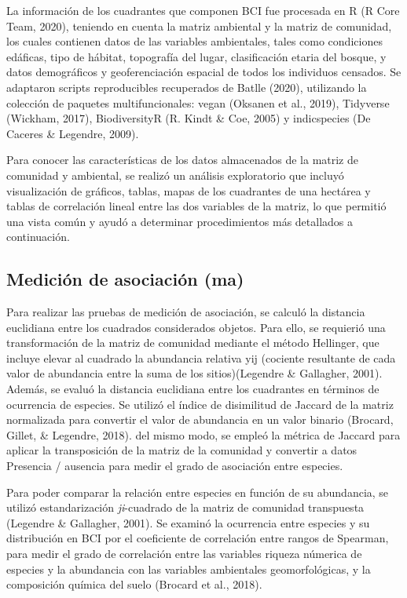 \documentclass[11pt,]{article}
\begin{document}
La información de los cuadrantes que componen BCI fue procesada en R (R
Core Team, 2020), teniendo en cuenta la matriz ambiental y la matriz de
comunidad, los cuales contienen datos de las variables ambientales,
tales como condiciones edáficas, tipo de hábitat, topografía del lugar,
clasificación etaria del bosque, y datos demográficos y geoferenciación
espacial de todos los individuos censados. Se adaptaron scripts
reproducibles recuperados de Batlle (2020), utilizando la colección de
paquetes multifuncionales: vegan (Oksanen et al., 2019), Tidyverse
(Wickham, 2017), BiodiversityR (R. Kindt \& Coe, 2005) y indicspecies
(De Caceres \& Legendre, 2009).

Para conocer las características de los datos almacenados de la matriz
de comunidad y ambiental, se realizó un análisis exploratorio que
incluyó visualización de gráficos, tablas, mapas de los cuadrantes de
una hectárea y tablas de correlación lineal entre las dos variables de
la matriz, lo que permitió una vista común y ayudó a determinar
procedimientos más detallados a continuación.

\subsection{Medición de asociación
(ma)}\label{mediciuxf3n-de-asociaciuxf3n-ma}

Para realizar las pruebas de medición de asociación, se calculó la
distancia euclidiana entre los cuadrados considerados objetos. Para
ello, se requierió una transformación de la matriz de comunidad mediante
el método Hellinger, que incluye elevar al cuadrado la abundancia
relativa yij (cociente resultante de cada valor de abundancia entre la
suma de los sitios)(Legendre \& Gallagher, 2001). Además, se evaluó la
distancia euclidiana entre los cuadrantes en términos de ocurrencia de
especies. Se utilizó el índice de disimilitud de Jaccard de la matriz
normalizada para convertir el valor de abundancia en un valor binario
(Brocard, Gillet, \& Legendre, 2018). del mismo modo, se empleó la
métrica de Jaccard para aplicar la transposición de la matriz de la
comunidad y convertir a datos Presencia / ausencia para medir el grado
de asociación entre especies.

Para poder comparar la relación entre especies en función de su
abundancia, se utilizó estandarización \emph{ji}-cuadrado de la matriz
de comunidad transpuesta (Legendre \& Gallagher, 2001). Se examinó la
ocurrencia entre especies y su distribución en BCI por el coeficiente de
correlación entre rangos de Spearman, para medir el grado de correlación
entre las variables riqueza númerica de especies y la abundancia con las
variables ambientales geomorfológicas, y la composición química del
suelo (Brocard et al., 2018).
\end{document}
